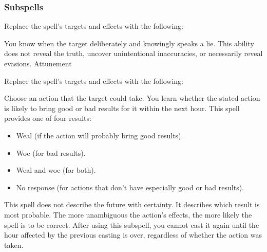 \subsubsection{Subspells}
Replace the spell's targets and effects with the following:
\begin{spellcontent}
\begin{augmenttargetinginfo}
\end{augmenttargetinginfo}
\begin{augmenteffects}
\spelleffect
You know when the target deliberately and knowingly speaks a lie.
This ability does not reveal the truth, uncover unintentional inaccuracies, or necessarily reveal evasions.
\spelldur Attunement
\end{augmenteffects}
\end{spellcontent}
Replace the spell's targets and effects with the following:
\begin{spellcontent}
\begin{augmenttargetinginfo}
\end{augmenttargetinginfo}
\begin{augmenteffects}
\spelleffect
Choose an action that the target could take.
You learn whether the stated action is likely to bring good or bad results for it within the next hour.
This spell provides one of four results:
\begin{itemize}
\item Weal (if the action will probably bring good results).
\item Woe (for bad results).
\item Weal and woe (for both).
\item No response (for actions that don't have especially good or bad results).
\end{itemize}
This spell does not describe the future with certainty.
It describes which result is most probable.
The more unambiguous the action's effects, the more likely the spell is to be correct.
After using this subspell, you cannot cast it again until the hour affected by the previous casting is over, regardless of whether the action was taken.
\end{augmenteffects}
\end{spellcontent}
